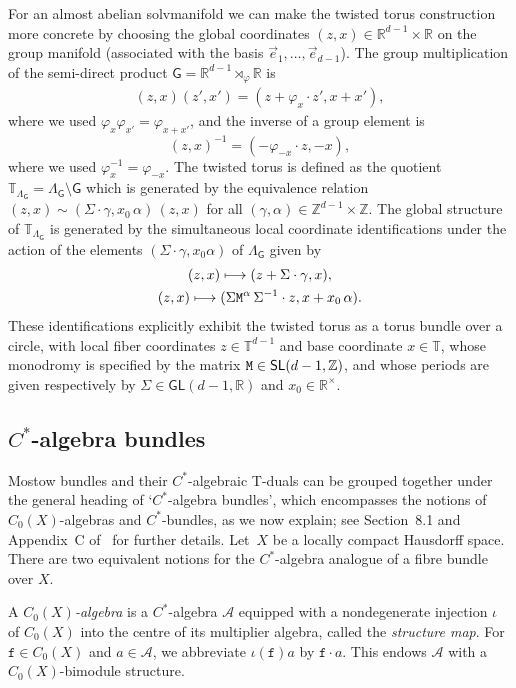 \documentclass[10pt,a4paper]{amsart}
\numberwithin{equation}{section}
\newcommand{\sfG}{\mathsf{G}}
\newcommand{\sfGL}{\mathsf{GL}}
\newcommand{\sfSL}{\mathsf{SL}}
\newcommand{\zed}{{\mathbb Z}} %
\newcommand{\real}{{\mathbb R}} %
\newcommand{\torus}{{\mathbb T}} %
\def\alg{{\mathcal A}}
\begin{document}
For an almost abelian solvmanifold we can make the twisted torus construction more concrete
by choosing the global
coordinates $(z,x)\in\real^{d-1}\times\real$ on the group
manifold (associated with the basis $\vec e_1,\ldots,\vec e_{d-1}$).
The group multiplication of the semi-direct product
$\sfG=\real^{d-1}\rtimes_\varphi\real$ is
\begin{gather}\label{eq:grouplaw}
(z,x) (z',x') = (z + \varphi_x\cdot z',x+x') ,
\end{gather}
where we used $\varphi_x \varphi_{x'} = \varphi_{x+x'}$, and the
inverse of a group element is
\[
(z,x)^{-1} = (-\varphi_{-x}\cdot z,-x) ,
\]
where we used $\varphi_x^{-1}=\varphi_{-x}$.
The twisted torus is defined as the quotient $\torus_{\Lambda_\sfG}=\Lambda_\sfG
{\setminus} \sfG$ which is generated by the equivalence relation $(z,x)\sim
(\Sigma\cdot\gamma,x_0\,\alpha)\,(z,x)$ for all $(\gamma,\alpha)\in\zed^{d-1}\times\zed$. The global structure
of $\torus_{\Lambda_{\sfG}}$ is generated by the simultaneous local coordinate
identifications under the action of the elements
$(\Sigma\cdot\gamma,x_0 \alpha) $ of $\Lambda_\sfG$ given by
\begin{gather}
(z,x) \longmapsto (
 z+\Sigma\cdot\gamma,x) , \nonumber \\
(z,x) \longmapsto (
\Sigma {\tt M}^\alpha\,\Sigma^{-1}\cdot z,x+x_0\,\alpha) .\label{eq:Mostowtorus}
\end{gather}
These identifications explicitly exhibit the twisted torus as a torus bundle over a circle, with
local fiber coordinates $z\in \torus^{d-1}$ and base coordinate $x\in \torus$,
 whose monodromy is specified by the matrix ${\tt M}\in
 \sfSL(d-1,\zed)$, and whose periods are given respectively by
 $\Sigma\in\sfGL(d-1,\real)$ and $x_0\in\real^\times$.

\subsection{$C^*$-algebra bundles}\label{sec:C*bundles}

Mostow bundles and their $C^*$-algebraic T-duals can be grouped together
under the general heading of `$C^*$-algebra bundles', which encompasses
the notions of $C_0(X)$-algebras and $C^*$-bundles, as we now
explain; see Section~8.1 and Appendix~C of~\cite{Williams2007} for
further details.
Let~$X$ be a locally compact Hausdorff space. There are two equivalent
notions for the $C^*$-algebra analogue of a fibre bundle over $X$.

A \emph{$C_0(X)$-algebra} is a $C^*$-algebra $\alg$
equipped with a nondegenerate injection $\iota$ of $C_0(X)$
into the centre of its multiplier algebra, called the \emph{structure
 map}. For $\mathtt{f}\in C_0(X)$ and
$a\in\alg$, we abbreviate $\iota(\mathtt{f})a$ by $\mathtt{f}\cdot a$. This endows
$\alg$ with a $C_0(X)$-bimodule
structure.
\end{document}
